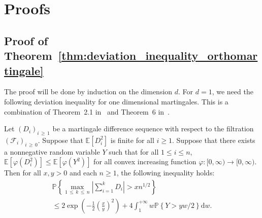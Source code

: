 \documentclass[10pt]{amsart}
\theoremstyle{definition}\newtheorem{defi}[theo]{Definition}\newtheorem{rema}[theo]{Remark}\newtheorem{exam}[theo]{Example}\newtheorem{exem}[theo]{Example}\newtheorem{nota}[theo]{Notation}
\newcommand{\Fca}{\mathcal{F}}
\newcommand{\rmd}{\mathrm{d}}
\newcommand\PP{\mathbb{P}}
\newcommand{\E}[1]{\mathbb E[#1]}
\newcommand{\pr}[1]{(#1)}
\begin{document}
\section{Proofs}\label{sec:proofs}


\subsection{Proof of Theorem~\ref{thm:deviation_inequality_orthomartingale}}

The proof will be done by induction on the dimension $d$. For $d=1$, we need the following deviation inequality for one dimensional martingales. This is a combination of Theorem~2.1 in~\cite{MR3311214} and Theorem~6 in~\cite{MR606989}.

\begin{prop}\label{prop:inegalite_deviation_martingales_dominee}
Let $\pr{D_i}_{i\,\geq\,1}$ be a martingale difference sequence with respect to the filtration $\pr{\Fca_i}_{i\,\geq\,0}$. Suppose that $\E{D_i ^2}$ is finite for all $i\geq 1$. Suppose that there exists a nonnegative random variable $Y$ such that for all $1\leq i\leq n$, $\E{\varphi\pr{D_i^2}}\leq\E{\varphi\pr{Y^2}}$ for all convex increasing function $\varphi\colon [0,\infty)\to[0,\infty)$. Then for all $x,y>0$ and each $n\geq 1$, the following inequality holds:
\begin{multline}\label{eq:inegalite_max_martingales_moments_ordre_p_domination_sto}
\PP\left\{\max_{1\,\leq\,k\,\leq\,n}\left|\sum_{i=1}^kD_i\right|>x n^{1/2} \right\}
\\
\leq 2\exp\left(-\frac 12\left(\frac{x}{y}\right)^{2} \right)
+ 4\int_{1 }^{+\infty}w\PP\left\{ Y>yw/2\right\}\rmd w.
\end{multline}
\end{prop}
\end{document}
